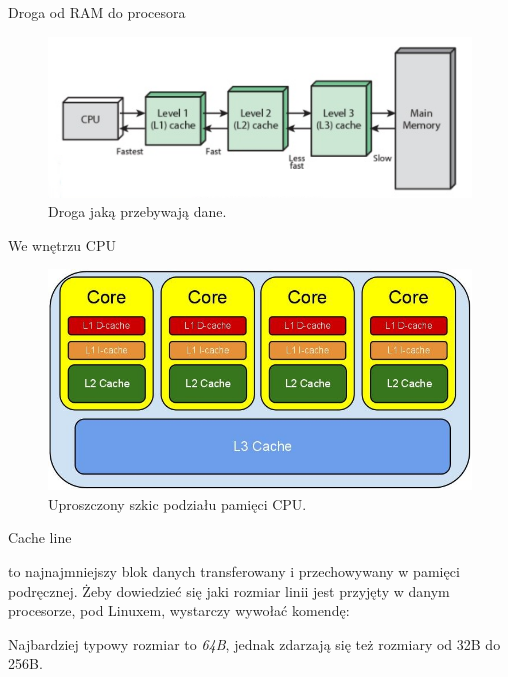 \documentclass{if-beamer}
\begin{document}
\begin{frame}{Droga od RAM do procesora}

\begin{figure}
\centering
\includegraphics[scale=0.55]{memclose.png}
\caption{Droga jaką przebywają dane.}
\end{figure}

\end{frame}

\begin{frame}{We wnętrzu CPU}

\begin{figure}
\centering
\includegraphics[scale=0.4]{memcpu.png}
\caption{Uproszczony szkic podziału pamięci CPU.}
\end{figure}

\end{frame}

\begin{frame}{Cache line}

\textbf{} to najnajmniejszy blok danych transferowany i przechowywany w pamięci podręcznej. Żeby dowiedzieć się jaki rozmiar linii jest przyjęty w danym procesorze, pod Linuxem, wystarczy wywołać komendę:
  

Najbardziej typowy rozmiar to \emph{64B}, jednak zdarzają się też rozmiary od 32B do 256B.

\end{frame} 
\end{document}
